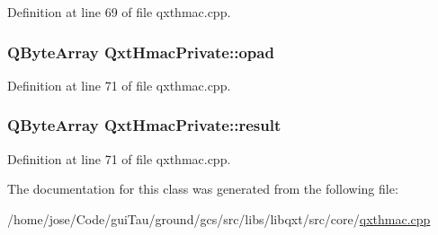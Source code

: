 Definition at line 69 of file qxthmac.\-cpp.

\hypertarget{class_qxt_hmac_private_a30b7c9267ff18b47d2eb980ecd67e607}{
\subsubsection[{opad}]{\setlength{\rightskip}{0pt plus 5cm}Q\-Byte\-Array Qxt\-Hmac\-Private\-::opad}}\label{class_qxt_hmac_private_a30b7c9267ff18b47d2eb980ecd67e607}


Definition at line 71 of file qxthmac.\-cpp.

\hypertarget{class_qxt_hmac_private_a75da1364701463ef1b395c3a380d28d2}{
\subsubsection[{result}]{\setlength{\rightskip}{0pt plus 5cm}Q\-Byte\-Array Qxt\-Hmac\-Private\-::result}}\label{class_qxt_hmac_private_a75da1364701463ef1b395c3a380d28d2}


Definition at line 71 of file qxthmac.\-cpp.



The documentation for this class was generated from the following file\-:\begin{DoxyCompactItemize}
\item 
/home/jose/\-Code/gui\-Tau/ground/gcs/src/libs/libqxt/src/core/\hyperlink{qxthmac_8cpp}{qxthmac.\-cpp}\end{DoxyCompactItemize}
